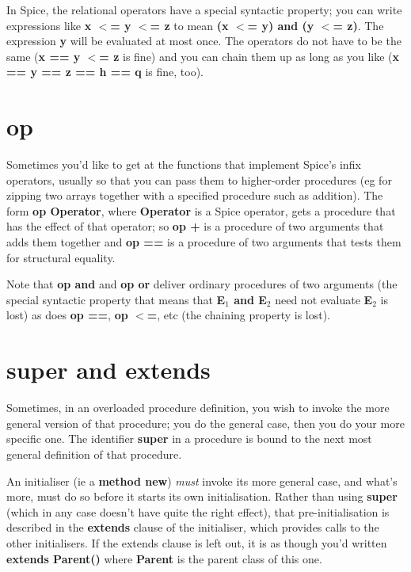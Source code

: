 \documentclass{report}
\begin{document}
In Spice, the relational operators have a special syntactic property;
you can write expressions like {\bf x $<$= y $<$= z} to mean {\bf (x $<$= y) and (y $<$= z)}.
The expression {\bf y} will be evaluated at most once. The operators do not have
to be the same ({\bf x == y $<$= z} is fine) and you can chain them up as long as
you like ({\bf x == y == z == h == q} is fine, too).

\section{op}


Sometimes you'd like to get at the functions that implement Spice's infix
operators, usually so that you can pass them to higher-order procedures
(eg for zipping two arrays together with a specified procedure such as
addition). The form {\bf op Operator}, where {\bf Operator} is a Spice operator,
gets a procedure that has the effect of that operator; so {\bf op +} is a
procedure of two arguments that adds them together and {\bf op ==} is a
procedure of two arguments that tests them for structural equality.

Note that {\bf op and} and {\bf op or} deliver ordinary procedures of two arguments
(the special syntactic property that means that {\bf E$_ 1$ and E$_ 2$} need not
evaluate {\bf E$_ 2$} is lost) as does {\bf op ==}, {\bf op $<$=}, etc (the chaining property
is lost).

\section{super and extends}


Sometimes, in an overloaded procedure definition, you wish to invoke
the more general version of that procedure; you do the general case, then you
do your more specific one. The identifier {\bf super} in a procedure is bound to
the next most general definition of that procedure.

An initialiser (ie a {\bf method new}) {\em must} invoke its more general case,
and what's more, must do so before it starts its own initialisation. Rather
than using {\bf super} (which in any case doesn't have quite the right effect),
that pre-initialisation is described in the {\bf extends} clause of the
initialiser, which provides calls to the other initialisers. If the extends
clause is left out, it is as though you'd written {\bf extends Parent()} where
{\bf Parent} is the parent class of this one.
\end{document}
